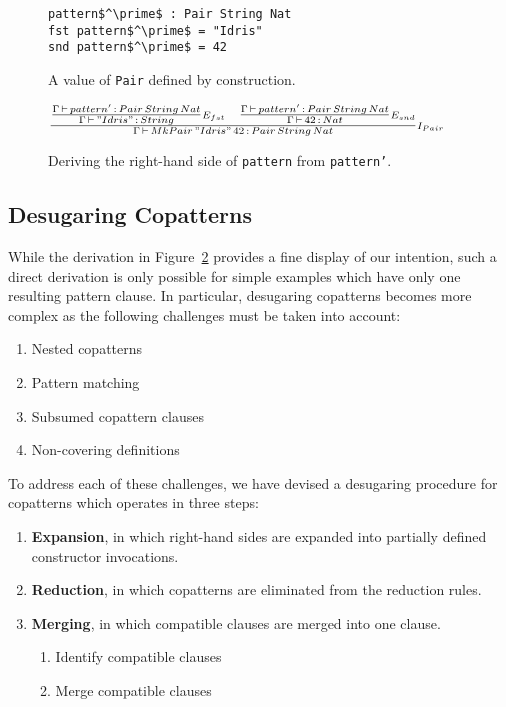 \begin{figure}
\begin{lstlisting}[mathescape]
pattern$^\prime$ : Pair String Nat
fst pattern$^\prime$ = "Idris"
snd pattern$^\prime$ = 42
\end{lstlisting}
  \caption{A value of \texttt{Pair} defined by construction.}
  \label{fig:pair_example_copatterns}
\end{figure}

\begin{figure}
  \centering
$\frac { \begin{matrix} \frac { \Gamma \, \vdash \,pattern'\, :\,
      Pair\, String\, Nat }{ \Gamma \, \vdash \, "Idris"\,:\,String
    } \scriptstyle E_{fst}   & \frac { \Gamma \, \vdash \,pattern'\, :\, Pair\, String\,
      Nat }{ \Gamma \, \vdash \, 42\,:\,Nat } \scriptstyle E_{snd}  \end{matrix} }{
  \Gamma \, \vdash \, MkPair\, "Idris"\, 42\, :\, Pair\, String\, Nat } \scriptstyle I_{ Pair }$
  \caption{Deriving the right-hand side of \texttt{pattern} from \texttt{pattern'}.}
  \label{fig:pair_elimination_on_introduction_rules_rewrite}
\end{figure}

\subsection{Desugaring Copatterns}
While the derivation in
Figure~\ref{fig:pair_elimination_on_introduction_rules_rewrite} provides a fine
display of our intention, such a direct derivation is only possible for simple
examples which have only one resulting pattern clause. In particular, desugaring
copatterns becomes more complex as the following challenges must be taken into account:

\begin{enumerate}
\item Nested copatterns
\item Pattern matching
\item Subsumed copattern clauses
\item Non-covering definitions
\end{enumerate}

To address each of these challenges, we have devised a desugaring procedure for
copatterns which operates in three steps:

\begin{enumerate}
\item \textbf{Expansion}, in which right-hand sides are expanded into partially
  defined constructor invocations.
\item \textbf{Reduction}, in which copatterns are eliminated from the reduction rules.
\item \textbf{Merging}, in which compatible clauses are merged into one clause.
  \begin{enumerate}
  \item Identify compatible clauses
  \item Merge compatible clauses
  \end{enumerate}
\end{enumerate}

